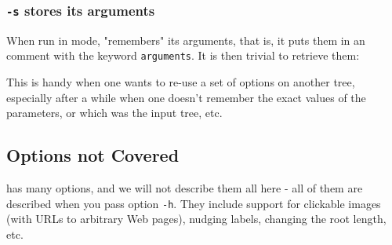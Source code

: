 \subsubsection{\display{} \texttt{-s} stores its arguments}

When run in \svg{} mode, \display{} "remembers" its arguments, that is, it puts
them in an \xml{} comment with the keyword \texttt{arguments}. It is then
trivial to retrieve them:





\noindent{}This is handy when one wants to re-use a set of options on another
tree, especially after a while when one doesn't remember the exact values of the
parameters, or which was the input tree, etc. 

\subsection{Options not Covered}

\display{} has many options, and we will not describe them all here - all of
them are described when you pass option \texttt{-h}. They include support for
clickable images (with URLs to arbitrary Web pages), nudging labels, changing
the root length, etc. 
